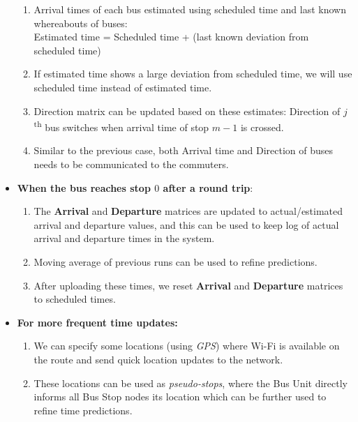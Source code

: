 \begin{itemize}
\begin{enumerate}
\item Arrival times of each bus estimated using scheduled time and last known whereabouts of buses:\\
Estimated time = Scheduled time + (last known deviation from scheduled 
time)
\item If estimated time shows a large deviation from scheduled time, we will use scheduled time instead of estimated time.
\item Direction matrix can be updated based on these estimates: Direction of $j$\textsuperscript{th} bus switches when arrival time of stop $m-1$ is crossed.
\item Similar to the previous case, both Arrival time and Direction of buses needs to be communicated to the commuters.
\end{enumerate}
\item \textbf{When the bus reaches stop $0$ after a round trip}:
\begin{enumerate}
\item  The \textbf{Arrival} and \textbf{Departure} matrices are updated to actual/estimated arrival and departure values, and this can be used to keep log of actual arrival and departure times in the system.
\item Moving average of previous runs can be used to refine predictions.
\item  After uploading these times, we reset \textbf{Arrival} and \textbf{Departure} matrices to scheduled times.
\end{enumerate}
\item \textbf{For more frequent time updates:}
\begin{enumerate}
\item We can specify some locations (using \textit{GPS}) where Wi-Fi is available on the route and send quick location updates to the network.
\item These locations can be used as \textit{pseudo-stops}, where the Bus Unit directly informs all Bus Stop nodes its location which can be further used to refine time predictions.
\end{enumerate}
\end{itemize}